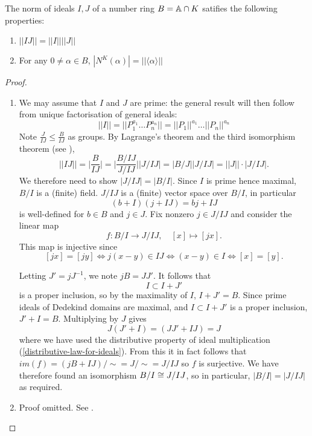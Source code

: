 \begin{lemma}\label{ideals-and-norms}
The norm of ideals $I,J$ of a number ring $B=\mathbb{A}\cap K$ satifies the following properties:
\begin{enumerate}[(1)]
    \item $||IJ||=||I|| ||J||$
    \item For any $0\neq \alpha\in B$, $|N^K(\alpha)|=||\langle \alpha \rangle||$
\end{enumerate}
\end{lemma}
\begin{proof}
\begin{enumerate}[(1)]
    \item We may assume that $I$ and $J$ are prime: the general result will then follow from unique factorisation of general ideals:
    $$||I||=||P_1^{a_1}\dots P_n^{a_n}||=||P_1||^{a_1}\dots ||P_n||^{a_n}$$
    Note $\frac{J}{IJ}\leq \frac{B}{IJ}$ as groups. By Lagrange's theorem and the third isomorphism theorem (see \cite{GroupTheory}),
    $$||IJ||=\Big|\frac{B}{IJ}\Big|=\Big|\frac{B/IJ}{J/IJ}\Big||J/IJ|=|B/J||J/IJ|=||J||\cdot|J/IJ|.$$ We therefore need to show $|J/IJ|=|B/I|.$ Since $I$ is prime hence maximal, $B/I$ is a (finite) field. $J/IJ$ is a (finite) vector space over $B/I$, in particular $$(b+I)(j+IJ)=bj+IJ$$
    is well-defined for $b\in B$ and $j\in J$. Fix nonzero $j\in J/IJ$ and consider the linear map $$f:B/I\rightarrow J/IJ, \quad[x]\mapsto [jx].$$ This map is injective since $$[jx]=[jy]\iff j(x-y)\in IJ\iff (x-y)\in I\iff [x]=[y].$$ 
    
    Letting $J'=jJ^{-1}$, we note $jB=JJ'$. It follows that $$I\subset I+J'$$
    is a proper inclusion, so by the maximality of $I$, $I+J'=B$. Since prime ideals of Dedekind domains are maximal, and $I\subset I+J'$ is a proper inclusion, $J'+I=B$. Multiplying by $J$ gives 
    $$J(J'+I)=(JJ'+IJ)=J$$ where we have used the distributive property of ideal multiplication (\cref{distributive-law-for-ideals}). From this it in fact follows that $im(f)=(jB+IJ)/\sim= J/\sim=J/IJ$ so $f$ is surjective. We have therefore found an isomorphism $B/I\cong J/IJ$, so in particular, $|B/I|=|J/IJ|$ as required.
    \cite{Torres}
    \item Proof omitted. See \cite{NumberFields}.
\end{enumerate}\end{proof}

